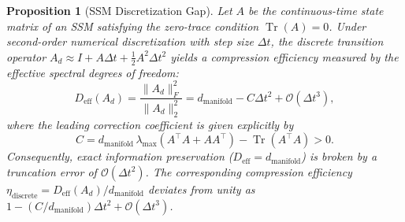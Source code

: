 \documentclass[11pt, a4paper]{article}
\newtheorem{prop}[theo]{Proposition}
\theoremstyle{plain}
\DeclareMathOperator{\Tr}{Tr}
\begin{document}
\begin{prop}[SSM Discretization Gap]\label{prop:ssm_discrete}
Let $A$ be the continuous-time state matrix of an SSM satisfying the zero-trace condition $\Tr(A)=0$. Under second-order numerical discretization with step size $\Delta t$, the discrete transition operator $A_d \approx I + A\Delta t + \frac{1}{2}A^2\Delta t^2$ yields a compression efficiency measured by the effective spectral degrees of freedom:
\begin{equation}
D_{\text{eff}}(A_d) = \frac{\|A_d\|_F^2}{\|A_d\|_2^2} = d_{\text{manifold}} - C \Delta t^2 + \mathcal{O}(\Delta t^3),
\end{equation}
where the leading correction coefficient is given explicitly by
\begin{equation}
C = d_{\text{manifold}} \, \lambda_{\max}(A^\top A + A A^\top) - \Tr(A^\top A) > 0.
\end{equation}
Consequently, exact information preservation ($D_{\text{eff}} = d_{\text{manifold}}$) is broken by a truncation error of $\mathcal{O}(\Delta t^2)$. The corresponding compression efficiency $\eta_{\text{discrete}} = D_{\text{eff}}(A_d)/d_{\text{manifold}}$ deviates from unity as $1 - (C/d_{\text{manifold}}) \Delta t^2 + \mathcal{O}(\Delta t^3)$.
\end{prop}
\end{document}
